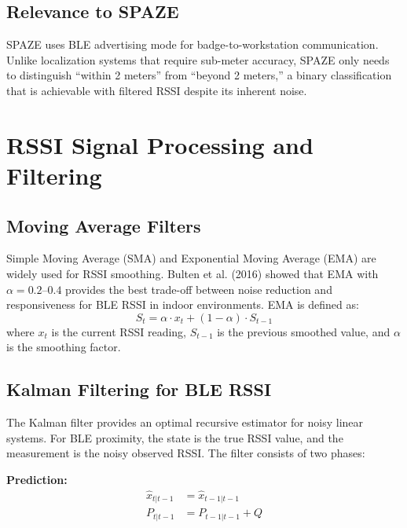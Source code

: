 \documentclass[conference]{IEEEtran}
\begin{document}
\subsection{Relevance to SPAZE}
SPAZE uses BLE advertising mode for badge-to-workstation communication. Unlike localization systems that require sub-meter accuracy, SPAZE only needs to distinguish ``within 2 meters'' from ``beyond 2 meters,'' a binary classification that is achievable with filtered RSSI despite its inherent noise.

\section{RSSI Signal Processing and Filtering}
\label{sec:rssi}

\subsection{Moving Average Filters}
Simple Moving Average (SMA) and Exponential Moving Average (EMA) are widely used for RSSI smoothing. Bulten et al. (2016) \cite{bulten2016} showed that EMA with $\alpha = 0.2$--$0.4$ provides the best trade-off between noise reduction and responsiveness for BLE RSSI in indoor environments. EMA is defined as:
\begin{equation}
    S_t = \alpha \cdot x_t + (1 - \alpha) \cdot S_{t-1}
    \label{eq:ema}
\end{equation}
where $x_t$ is the current RSSI reading, $S_{t-1}$ is the previous smoothed value, and $\alpha$ is the smoothing factor.

\subsection{Kalman Filtering for BLE RSSI}
The Kalman filter \cite{kalman1960} provides an optimal recursive estimator for noisy linear systems. For BLE proximity, the state is the true RSSI value, and the measurement is the noisy observed RSSI. The filter consists of two phases:

\textbf{Prediction:}
\begin{align}
    \hat{x}_{t|t-1} &= \hat{x}_{t-1|t-1} \label{eq:kalman_pred} \\
    P_{t|t-1} &= P_{t-1|t-1} + Q \label{eq:kalman_covar}
\end{align}
\end{document}
